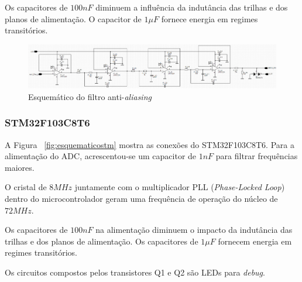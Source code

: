\documentclass[
	12pt,				%
	openright,			%
	twoside,			%
	a4paper,			%
	english,			%
	french,				%
	spanish,			%
	brazil,				%
	]{abntex2}
\begin{document}
				Os capacitores de $100nF$ diminuem a influência da
				indutância das trilhas e dos planos de alimentação. O
				capacitor de $1\mu F$ fornece energia em regimes
				transitórios.

				\begin{landscape}
					\vspace*{\fill}
					\begin{center}
						\begin{figure}[!h]
							\centering
							\includegraphics[scale = 0.58]{../Fotos/FAAesquematico.png}
							\caption{Esquemático do filtro anti-\textit{aliasing}}
							\label{fig:esquematicoFAA}
						\end{figure}
					\end{center}
					\vspace*{\fill}
					
				\end{landscape}

			\subsubsection{STM32F103C8T6}

				A Figura ~\ref{fig:esquematicostm} mostra as conexões do STM32F103C8T6. Para a
				alimentação do ADC, acrescentou-se um capacitor de $1nF$ para
				filtrar frequências maiores.

				O cristal de $8MHz$ juntamente com o multiplicador PLL
				(\textit{Phase-Locked Loop}) dentro do microcontrolador
				geram uma frequência de operação do núcleo de $72MHz$.

				Os capacitores de $100nF$ na alimentação diminuem o impacto
				da indutância das trilhas e dos planos de alimentação. Os
				capacitores de $1\mu F$ fornecem energia em regimes
				transitórios.

				Os circuitos compostos pelos transistores Q1 e Q2 são LEDs
				para \textit{debug}.
\end{document}
